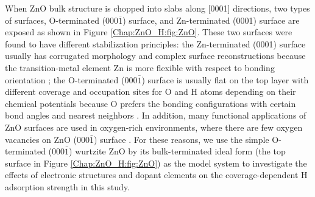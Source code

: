 When ZnO bulk structure is chopped into slabs along [0001] directions, two types of surfaces, O-terminated (000$\overline{1}$) surface, and Zn-terminated  (0001) surface are exposed as shown in Figure \ref{Chap:ZnO_H:fig:ZnO}. These two surfaces were found to have different stabilization principles\cite{lauritsen2011stabilization}: the Zn-terminated  (0001) surface usually has corrugated morphology and complex surface reconstructions because the transition-metal element Zn is more flexible with respect to bonding orientation \cite{dulub2003novel,woll2007chemistry}; the O-terminated (000$\bar{1}$) surface is usually flat on the top layer with different coverage and occupation sites for O and H atoms depending on their chemical potentials because O prefers the bonding configurations with certain bond angles and nearest neighbors \cite{meyer2004first,lauritsen2011stabilization}. In addition, many functional applications of ZnO surfaces are used in oxygen-rich environments, where there are few oxygen vacancies on ZnO (000$\bar{1}$) surface \cite{meyer2004first,lauritsen2011stabilization,wahl2013stabilization}. For these reasons, we use the simple O-terminated (000$\bar{1}$) wurtzite ZnO by its bulk-terminated ideal form (the top surface in Figure \ref{Chap:ZnO_H:fig:ZnO}) as the model system to investigate the effects of electronic structures and dopant elements on the coverage-dependent H adsorption strength in this study.